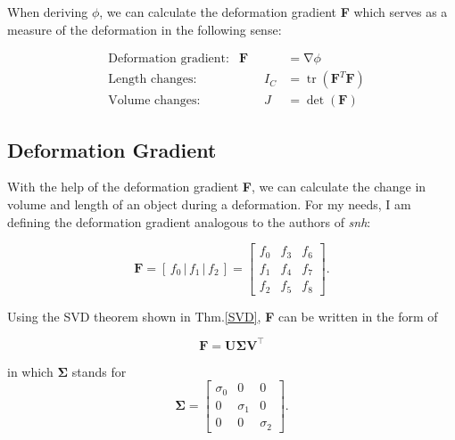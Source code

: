 When deriving $\phi$, we can calculate the deformation gradient \textbf{F} which serves as a measure of the deformation in the following sense: 

\begin{align*}
&\text{Deformation gradient:} & \mathbf{F}&=\operatorname{\nabla} \phi \\
&\text{Length changes:} & \qquad I_{C}&=\operatorname{tr}\left(\mathbf{F}^{T} \mathbf{F}\right) \\
&\text{Volume changes:} & \qquad J&=\operatorname{det}(\mathbf{F})
\end{align*}



\subsection{Deformation Gradient}
With the help of the deformation gradient \textbf{F}, we can calculate the change in volume and length of an object during a deformation.
For my needs, I am defining the deformation gradient analogous to the authors of \textit{\acrshort{snh}}:

\begin{equation}\label{eq:deformation_gradient}
\textbf{F} = \left[ \,f_0\, \bigg| \,f_1\, \bigg| \,f_2\, \right] = \begin{bmatrix} f_0 & f_3 & f_6 \\ f_1 & f_4 & f_7 \\ f_2 & f_5 & f_8 \end{bmatrix}.
\end{equation}

Using the SVD theorem shown in Thm.\ref{SVD}, \textbf{F} can be written in the form of

\begin{equation}\label{eq:svd_gradient}
\mathbf{F} = \mathbf{U \Sigma V^\intercal}
\end{equation}

in which $\mathbf{\Sigma}$ stands for
\begin{equation}\label{eq:svd_simga}
\mathbf{\Sigma} = \left[\begin{matrix}  \sigma_0 & 0 & 0 \\ 0 & \sigma_1 & 0 \\ 0 & 0 & \sigma_2 \end{matrix}\right] .
\end{equation}


